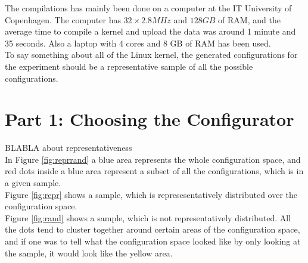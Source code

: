 \documentclass[a4paper,11pt]{report}
\begin{document}
The compilations has mainly been done on a computer at the IT University 
of Copenhagen. The computer has $32\times2.8 MHz$ and $128 GB$ of RAM, and the 
average time to compile a kernel and upload the data was around 1 minute and 35 
seconds. Also a laptop with 4 cores and 8 GB of RAM has been used.
\\

To say something about all of the Linux kernel, the generated configurations 
for the experiment should be a representative sample of all the possible 
configurations. 



        \section{Part 1: Choosing the Configurator}
        \label{rephunt}

BLABLA about representativeness
\\


In Figure \ref{fig:reprrand} a blue area represents the whole configuration 
space, and red dots inside a blue area represent a subset of all the 
configurations, which is in a given sample.
\\

Figure \ref{fig:repr} shows a sample, which is represesentatively distributed 
over the configuration space. 
\\

Figure \ref{fig:rand} shows a sample, which is not representatively 
distributed. All the dots tend to cluster together around certain areas of the 
configuration space, and if one was to tell what the configuration space looked 
like by only looking at the sample, it would look like the yellow area.
\end{document}
